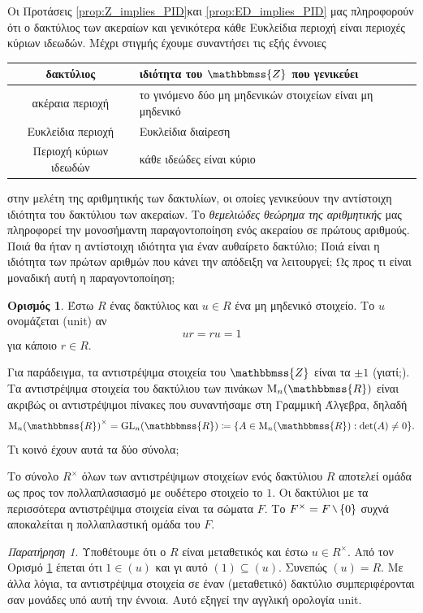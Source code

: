 \documentclass[12pt,a4paper,reqno]{amsart}
\theoremstyle{definition}
\newtheorem{definition}[theorem]{Ορισμός}
\theoremstyle{remark}
\newtheorem*{remark}{Παρατήρηση}
\numberwithin{theorem}{section}
\numberwithin{exercise}{section}
\numberwithin{equation}{section}
\newcommand{\ZZ}{\mathbbmss{Z}}
\newcommand{\RR}{\mathbbmss{R}}
\newcommand{\rmM}{\mathrm{M}}
\newcommand{\GL}{\mathrm{GL}}
\newcommand{\mysetminusD}{\hbox{\tikz{\draw[line width=0.6pt,line cap=round] (3pt,0) -- (0,6pt);}}}
\newcommand{\mysetminusT}{\mysetminusD}
\newcommand{\mysetminusS}{\hbox{\tikz{\draw[line width=0.45pt,line cap=round] (2pt,0) -- (0,4pt);}}}
\newcommand{\mysetminusSS}{\hbox{\tikz{\draw[line width=0.4pt,line cap=round] (1.5pt,0) -- (0,3pt);}}}
\newcommand{\sm}{\mathbin{\mathchoice{\mysetminusD}{\mysetminusT}{\mysetminusS}{\mysetminusSS}}}
\newcommand{\defn}[1]{{\color{mylightblue}{#1}}}
\begin{document}
Οι Προτάσεις \ref{prop:Z_implies_PID}και \ref{prop:ED_implies_PID} μας πληροφορούν ότι ο δακτύλιος των ακεραίων και γενικότερα κάθε Ευκλείδια περιοχή είναι περιοχές κύριων ιδεωδών. Μέχρι στιγμής έχουμε συναντήσει τις εξής έννοιες
\begin{table}[H]
\centering
\renewcommand{\arraystretch}{1.3} 
\begin{tabular}{c|l}
\textbf{δακτύλιος}     & \textbf{ιδιότητα του $\ZZ$ που γενικεύει} \\ \hline
ακέραια περιοχή        & το γινόμενο δύο μη μηδενικών στοιχείων είναι μη μηδενικό \\ \hline
Ευκλείδια περιοχή      & Ευκλείδια διαίρεση \\ \hline
Περιοχή κύριων ιδεωδών & κάθε ιδεώδες είναι κύριο 
\end{tabular}
\end{table}
\noindent
στην μελέτη της αριθμητικής των δακτυλίων, οι οποίες γενικεύουν την αντίστοιχη ιδιότητα του δακτύλιου των ακεραίων. Το \emph{θεμελιώδες θεώρημα της αριθμητικής} μας πληροφορεί την μονοσήμαντη παραγοντοποίηση ενός ακεραίου σε πρώτους αριθμούς. Ποιά θα ήταν η αντίστοιχη ιδιότητα για έναν αυθαίρετο δακτύλιο; Ποιά είναι η ιδιότητα των πρώτων αριθμών που κάνει την απόδειξη να λειτουργεί; Ως προς τι είναι μοναδική αυτή η παραγοντοποίηση;

\begin{definition}
    \label{def:unit}
    Έστω $R$ ένας δακτύλιος και $u \in R$ ένα μη μηδενικό στοιχείο. Το $u$ ονομάζεται \defn{αντιστρέψιμο} (unit) αν 
    \[
    ur = ru = 1
    \]
    για κάποιο $r \in R$.
\end{definition}

Για παράδειγμα, τα αντιστρέψιμα στοιχεία του $\ZZ$ είναι τα $\pm1$ (γιατί;). Τα αντιστρέψιμα στοιχεία του δακτύλιου των πινάκων $\rmM_n(\RR)$ είναι ακριβώς οι αντιστρέψιμοι πίνακες που συναντήσαμε στη Γραμμική Άλγεβρα, δηλαδή 
\[
{\rmM_n(\RR)}^\times = \GL_n(\RR) \coloneqq \{A \in \rmM_n(\RR) : \det(A) \neq 0\}.
\]
Τι κοινό έχουν αυτά τα δύο σύνολα;

Το σύνολο $R^\times$ όλων των αντιστρέψιμων στοιχείων ενός δακτύλιου $R$ αποτελεί ομάδα ως προς τον πολλαπλασιασμό με ουδέτερο στοιχείο το $1$. Οι δακτύλιοι με τα περισσότερα αντιστρέψιμα στοιχεία είναι τα σώματα $F$. Το $F^\times = F \sm \{0\}$ συχνά αποκαλείται η πολλαπλαστική ομάδα του $F$.

\begin{remark}
    Υποθέτουμε ότι ο $R$ είναι μεταθετικός και έστω $u \in R^\times$. Από τον Ορισμό \ref{def:unit} έπεται ότι $1 \in (u)$ και γι αυτό $(1) \subseteq (u)$. Συνεπώς $(u) = R$. Με άλλα λόγια, τα αντιστρέψιμα στοιχεία σε έναν (μεταθετικό) δακτύλιο συμπεριφέρονται σαν μονάδες υπό αυτή την έννοια. Αυτό εξηγεί την αγγλική ορολογία unit.
\end{remark}
\end{document}
